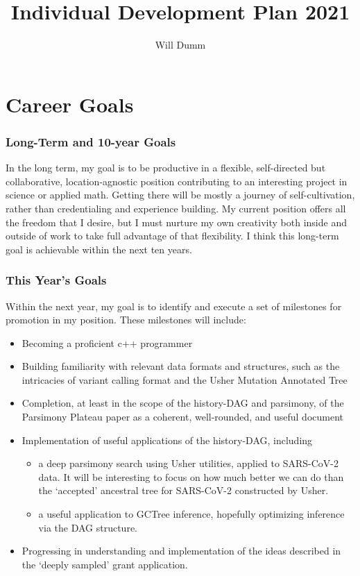 \documentclass{paper}
\title{Individual Development Plan 2021}
\author{Will Dumm}
\begin{document}
\maketitle



\section*{Career Goals}

\subsubsection*{Long-Term and 10-year Goals}
In the long term, my goal is to be productive in a flexible, self-directed but collaborative, location-agnostic position contributing to an interesting project in science or applied math.
Getting there will be mostly a journey of self-cultivation, rather than credentialing and experience building.
My current position offers all the freedom that I desire, but I must nurture my own creativity both inside and outside of work to take full advantage of that flexibility.
I think this long-term goal is achievable within the next ten years.

\subsubsection*{This Year's Goals}
Within the next year, my goal is to identify and execute a set of milestones for promotion in my position. These milestones will include:
\begin{itemize}
    \item Becoming a proficient c++ programmer
    \item Building familiarity with relevant data formats and structures, such as the intricacies of variant calling format and the Usher Mutation Annotated Tree
    \item Completion, at least in the scope of the history-DAG and parsimony, of the Parsimony Plateau paper as a coherent, well-rounded, and useful document
    \item Implementation of useful applications of the history-DAG, including
        \begin{itemize}
            \item a deep parsimony search using Usher utilities, applied to SARS-CoV-2 data.
                It will be interesting to focus on how much better we can do than the `accepted' ancestral tree for SARS-CoV-2 constructed by Usher.
            \item a useful application to GCTree inference, hopefully optimizing inference via the DAG structure.
        \end{itemize}
    \item Progressing in understanding and implementation of the ideas described in the `deeply sampled' grant application.
\end{itemize}
\end{document}
